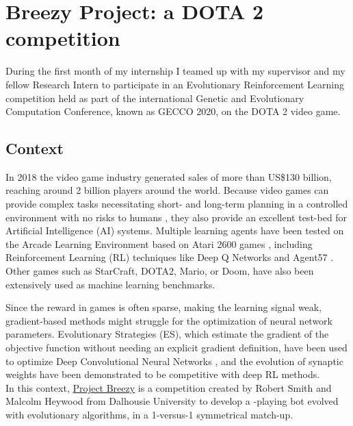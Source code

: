 \chapter{Breezy Project: a DOTA 2 competition}
\label{chap:dota}

During the first month of my internship I teamed up with my supervisor \href{https://www.linkedin.com/in/dennis-g-wilson/}{\color{blue}{Assoc. Prof. Dennis Wilson}} and my fellow Research Intern \href{https://www.linkedin.com/in/lucashervier/}{\color{blue}{Lucas Hervier}} to participate in an Evolutionary Reinforcement Learning competition held as part of the international Genetic and Evolutionary Computation Conference, known as GECCO 2020, on the DOTA 2 video game.

\section{Context}
In 2018 the video game industry generated sales of more than US\$130 billion, reaching around 2 billion players around the world. Because video games can provide complex tasks necessitating short- and long-term planning in a controlled environment with no risks to humans \cite{Games_AI}, they also provide an excellent test-bed for Artificial Intelligence (AI) systems. Multiple learning agents have been tested on the Arcade Learning Environment based on Atari 2600 games \cite{Atari}, including Reinforcement Learning (RL) techniques like Deep Q Networks \cite{DQN} and Agent57 \cite{agent57}. Other games such as StarCraft, DOTA2, Mario, or Doom, have also been extensively used as machine learning benchmarks.

Since the reward in games is often sparse, making the learning signal weak, gradient-based methods might struggle for the optimization of neural network parameters. Evolutionary Strategies (ES), which estimate the gradient of the objective function without needing an explicit gradient definition, have been used to optimize Deep Convolutional Neural Networks \cite{CMAES_DL}, and the evolution of synaptic weights have been demonstrated to be competitive with deep RL methods\cite{deep_neuroevo}.\\

In this context, \href{https://web.cs.dal.ca/~dota2/?page_id=353}{\color{blue} {Project Breezy}} is a competition created by Robert Smith and Malcolm Heywood from Dalhousie University to develop a \href{https://store.steampowered.com/app/570/Dota_2/}{\color{blue}{DOTA 2}}-playing bot evolved with evolutionary algorithms, in a 1-versus-1 symmetrical match-up. 


